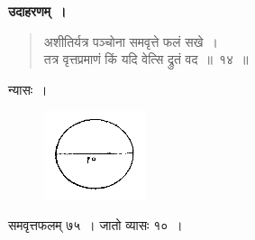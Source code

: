 \documentclass[11pt, openany]{book}
\begin{document}
 \textbf{उदाहरणम्~।} 
\begin{quote}
    \bqt 
    अशीतिर्यत्र पञ्चोना समवृत्ते फलं सखे~।\\
तत्र वृत्तप्रमाणं किं यदि वेत्सि द्रुतं वद~॥~१४~॥
\end{quote}
 
 न्यासः~। 
 \vspace{-4mm}

\begin{figure}[h!]
    \centering
    \includegraphics[scale=0.8]{graphics/capture21.png}
    \captionsetup{labelformat=empty}
\end{figure}
 \vspace{-4mm}

समवृत्तफलम् ७५~। जातो व्यासः १०~।
\newpage%
\end{document}
